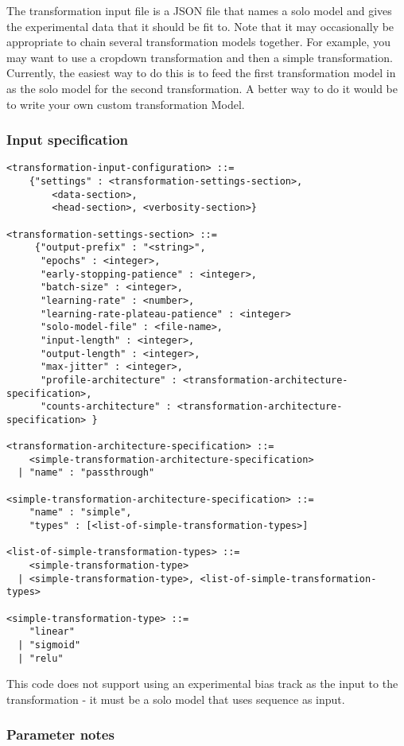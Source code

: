 \documentclass{article}
\begin{document}
The transformation input file is a JSON file that names a solo model and gives the experimental data that it should be fit to. 
Note that it may occasionally be appropriate to chain several transformation models together.
For example, you may want to use a cropdown transformation and then a simple transformation. 
Currently, the easiest way to do this is to feed the first transformation model in as the solo model
for the second transformation. A better way to do it would be to write your own custom transformation Model.

\subsubsection{Input specification}
\begin{lstlisting}
<transformation-input-configuration> ::=
    {"settings" : <transformation-settings-section>, 
        <data-section>, 
        <head-section>, <verbosity-section>}

<transformation-settings-section> ::=
     {"output-prefix" : "<string>", 
      "epochs" : <integer>, 
      "early-stopping-patience" : <integer>, 
      "batch-size" : <integer>, 
      "learning-rate" : <number>,
      "learning-rate-plateau-patience" : <integer> 
      "solo-model-file" : <file-name>,
      "input-length" : <integer>,
      "output-length" : <integer>,
      "max-jitter" : <integer>,
      "profile-architecture" : <transformation-architecture-specification>, 
      "counts-architecture" : <transformation-architecture-specification> } 

<transformation-architecture-specification> ::= 
    <simple-transformation-architecture-specification>
  | "name" : "passthrough"

<simple-transformation-architecture-specification> ::= 
    "name" : "simple",
    "types" : [<list-of-simple-transformation-types>]

<list-of-simple-transformation-types> ::= 
    <simple-transformation-type>
  | <simple-transformation-type>, <list-of-simple-transformation-types>

<simple-transformation-type> ::= 
    "linear"
  | "sigmoid"
  | "relu"

\end{lstlisting}

This code does not support using an experimental bias track as the input to the 
transformation - it must be a solo model that uses sequence as input.

\subsubsection{Parameter notes}
\end{document}
